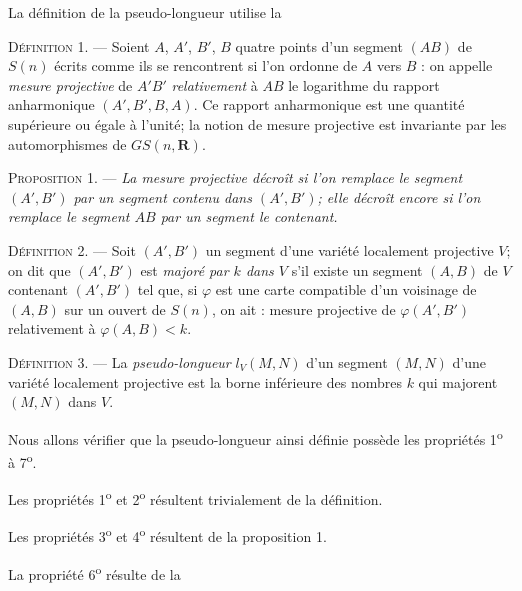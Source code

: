 \documentclass[11pt]{article}
\newcommand{\R}{\boldsymbol{R}}
\newcommand{\bzcf}[2]{#1}
\newenvironment{defin}[1][]{\par\medskip\noindent\textsc{Définition #1.} --- }{\par\medskip}
\newenvironment{prop}[1][]{\par\medskip\noindent\textsc{Proposition #1.} --- \itshape}{\par\medskip}
\newenvironment{proof}[1][]{\par}{\par}
\begin{document}
La définition de la pseudo-longueur utilise la

\begin{defin}[1]
Soient $A$, $A'$, $B'$, $B$ quatre points d'un segment $(AB)$ de $S(n)$ écrits comme ils se
rencontrent si l'on ordonne de $A$ vers $B$ : on appelle \textit{mesure projective} de $A'B'$
\textit{relativement} à $AB$ le logarithme du rapport anharmonique $(A', B', B, A)$. Ce rapport
anharmonique est une quantité supérieure ou égale à l'unité; la notion de mesure projective est
invariante par les automorphismes de $GS(n, \R)$.
\end{defin}

\begin{prop}[1]
La mesure projective décroît si l'on remplace le segment $(A', B')$ par un segment contenu dans
$(A', B')$; elle décroît encore si l'on remplace le segment $AB$ par un segment le contenant.
\end{prop}

\begin{defin}[2]
Soit $(A', B')$ un segment d'une variété localement projective $V$; on dit que $(A', B')$ est
\textit{majoré par $k$ dans $V$} s'il existe un segment $(A, B)$ de $V$ contenant $(A', B')$ tel
que, si $\varphi$ est une carte compatible d'un voisinage de $(A, B)$ sur un ouvert de $S(n)$, on
ait : mesure projective de $\varphi(A', B')$ relativement à $\varphi(A, B)<k$.
\end{defin}

\begin{defin}[3]
La \textit{pseudo-longueur} $l_V(M, N)$ d'un segment $(M, N)$ d'une variété localement projective
est la borne inférieure des nombres $k$ qui majorent $(M, N)$ dans $V$.
\end{defin}

\begin{proof}[Proof of \ref{bzthm:c2s2_proprietes_pseudo_longueur}]
Nous allons vérifier que la pseudo-longueur ainsi définie possède les propriétés
1\textsuperscript{o} à 7\textsuperscript{o}.

Les propriétés 1\textsuperscript{o} et 2\textsuperscript{o} résultent trivialement de la
définition.

Les propriétés 3\textsuperscript{o} et 4\textsuperscript{o} résultent de \bzcf{la proposition
1}{\ref{bzprop:c2s2p1_mesure_projective_monotone}}.

La propriété 6\textsuperscript{o} résulte de la
\end{proof}
\end{document}
